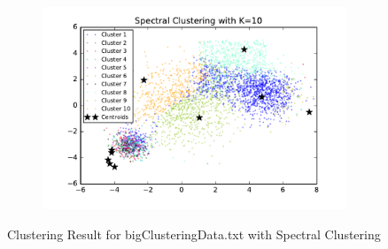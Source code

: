 \begin{figure}[htb]
\begin{subfigure}[b]{0.475\textwidth}
            \includegraphics[width=\textwidth]{./figures/bigClustering_spectral_10.pdf}
        \end{subfigure}
        
        \caption{Clustering Result for bigClusteringData.txt with Spectral Clustering}
        \label{fig:kmean_clustering}
\end{figure}

